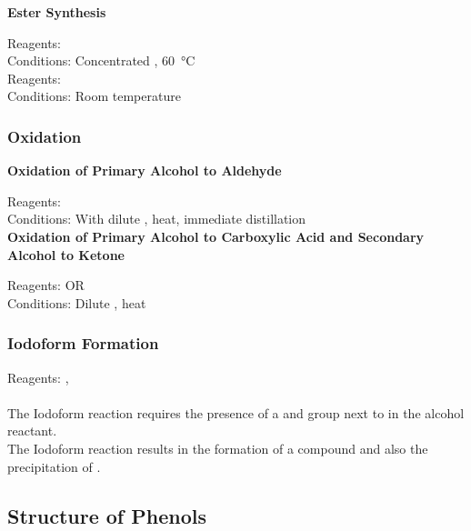 \documentclass[../main]{subfiles}
\begin{document}
	\noindent \textbf{Ester Synthesis}

	Reagents:  \\
	Conditions:  Concentrated , \SI{60}{\celsius} \\

	Reagents:  \\
	Conditions:  Room temperature \\

	\subsubsection{Oxidation}

	\noindent \textbf{Oxidation of Primary Alcohol to Aldehyde}

	Reagents:  \\
	Conditions: With dilute , heat, immediate distillation \\

	\noindent \textbf{Oxidation of Primary Alcohol to Carboxylic Acid and Secondary Alcohol to Ketone}

	Reagents:  OR  \\
	Conditions: Dilute , heat \\

	\subsubsection{Iodoform Formation}

	Reagents: ,  \\

	 \\

	The Iodoform reaction requires the presence of a  and  group next to  in the alcohol reactant. \\

	The Iodoform reaction results in the formation of a  compound and also the precipitation of . \\

	\subsection{Structure of Phenols}
\end{document}
